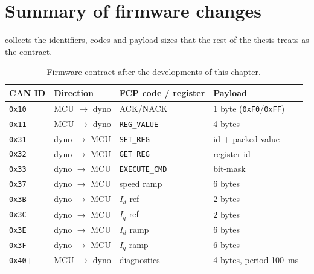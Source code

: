 \section{Summary of firmware changes}
 collects the identifiers, codes and payload sizes that
the rest of the thesis treats as the contract.

\begin{table}[ht]
\centering
\caption{Firmware contract after the developments of this chapter.}
\label{tab:dev-sum}
\begin{tabular}{llll}
\toprule
CAN ID & Direction & FCP code / register & Payload \\
\midrule
\texttt{0x10} & MCU $\rightarrow$ dyno & ACK/NACK & 1 byte (\texttt{0xF0}/\texttt{0xFF}) \\
\texttt{0x11} & MCU $\rightarrow$ dyno & \texttt{REG\_VALUE} & 4 bytes \\
\texttt{0x31} & dyno $\rightarrow$ MCU & \texttt{SET\_REG} & id + packed value \\
\texttt{0x32} & dyno $\rightarrow$ MCU & \texttt{GET\_REG} & register id \\
\texttt{0x33} & dyno $\rightarrow$ MCU & \texttt{EXECUTE\_CMD} & bit-mask \\
\texttt{0x37} & dyno $\rightarrow$ MCU & speed ramp & 6 bytes \\
\texttt{0x3B} & dyno $\rightarrow$ MCU & $I_d$ ref & 2 bytes \\
\texttt{0x3C} & dyno $\rightarrow$ MCU & $I_q$ ref & 2 bytes \\
\texttt{0x3E} & dyno $\rightarrow$ MCU & $I_d$ ramp & 6 bytes \\
\texttt{0x3F} & dyno $\rightarrow$ MCU & $I_q$ ramp & 6 bytes \\
\texttt{0x40}+ & MCU $\rightarrow$ dyno & diagnostics & 4 bytes, period \SI{100}{\milli\second} \\
\bottomrule
\end{tabular}
\end{table}

